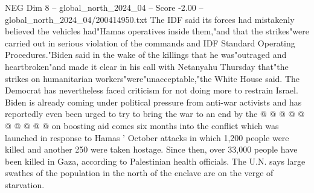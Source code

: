 \begin{textsample}{NEG Dim 8 – global\_north\_2024\_04 – Score -2.00 – global\_north\_2024\_04/200414950.txt}
The IDF said its forces had mistakenly believed the vehicles had"Hamas operatives inside them,"and that the strikes"were carried out in serious violation of the commands and IDF Standard Operating Procedures."Biden said in the wake of the killings that he was"outraged and heartbroken"and made it clear in his call with Netanyahu Thursday that"the strikes on humanitarian workers"were"unacceptable,"the White House said.
The Democrat has nevertheless faced criticism for not doing more to restrain Israel.
Biden is already coming under political pressure from anti-war activists and has reportedly even been urged to try to bring the war to an end by the @ @ @ @ @ @ @ @ @ @ on boosting aid comes six months into the conflict which was launched in response to Hamas ' October attacks in which 1,200 people were killed and another 250 were taken hostage.
Since then, over 33,000 people have been killed in Gaza, according to Palestinian health officials.
The U.N. says large swathes of the population in the north of the enclave are on the verge of starvation.

\end{textsample}
